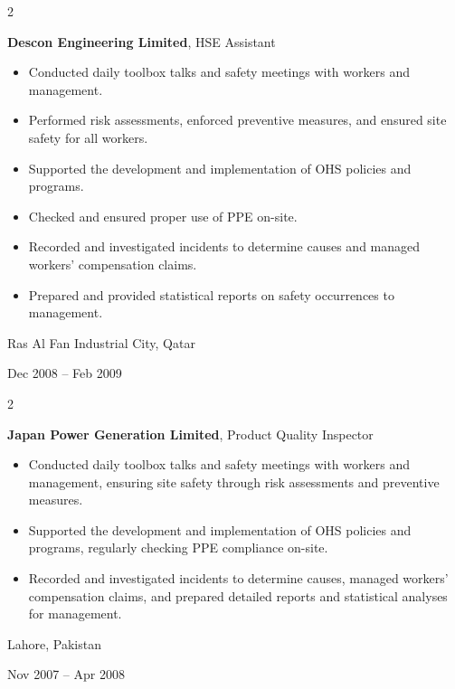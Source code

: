 \documentclass[10pt, a4paper]{article}
\newenvironment{highlights}{
    \begin{itemize}[
        topsep=0.10 cm,
        parsep=0.10 cm,
        partopsep=0pt,
        itemsep=0pt,
        leftmargin=0 cm + 10pt
    ]
}{
    \end{itemize}
} %
\newenvironment{twocolentry}[2][]{
    \onecolentry
    \def\secondColumn{#2}
    \setcolumnwidth{\fill, 2.5 cm}
    \begin{paracol}{2}
}{
    \switchcolumn \raggedleft \secondColumn
    \end{paracol}
    \endonecolentry
} %
\begin{document}
        \vspace{0.2 cm}

        \begin{twocolentry}{
            Ras Al Fan Industrial City, Qatar

        Dec 2008 – Feb 2009
        }
            \textbf{Descon Engineering Limited}, HSE Assistant
            \begin{highlights}
                \item Conducted daily toolbox talks and safety meetings with workers and management.
                \item Performed risk assessments, enforced preventive measures, and ensured site safety for all workers.
                \item Supported the development and implementation of OHS policies and programs.
                \item Checked and ensured proper use of PPE on-site.
                \item Recorded and investigated incidents to determine causes and managed workers' compensation claims.
                \item Prepared and provided statistical reports on safety occurrences to management.
            \end{highlights}
        \end{twocolentry}


        \vspace{0.2 cm}

        \begin{twocolentry}{
            Lahore, Pakistan

        Nov 2007 – Apr 2008
        }
            \textbf{Japan Power Generation Limited}, Product Quality Inspector
            \begin{highlights}
                \item Conducted daily toolbox talks and safety meetings with workers and management, ensuring site safety through risk assessments and preventive measures.
                \item Supported the development and implementation of OHS policies and programs, regularly checking PPE compliance on-site.
                \item Recorded and investigated incidents to determine causes, managed workers' compensation claims, and prepared detailed reports and statistical analyses for management.
            \end{highlights}
        \end{twocolentry}
\end{document}
